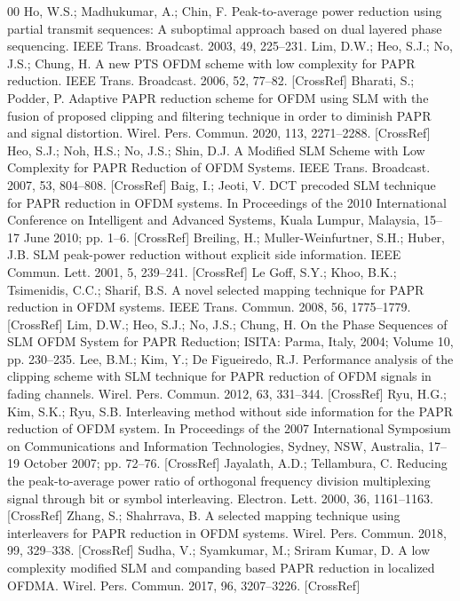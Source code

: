 \documentclass[conference]{IEEEtran}
\begin{document}
\begin{thebibliography}{00}
 Ho, W.S.; Madhukumar, A.; Chin, F. Peak-to-average power reduction using partial transmit sequences: A suboptimal approach based on dual layered phase sequencing. IEEE Trans. Broadcast. 2003, 49, 225–231.
 Lim, D.W.; Heo, S.J.; No, J.S.; Chung, H. A new PTS OFDM scheme with low complexity for PAPR reduction. IEEE Trans. Broadcast. 2006, 52, 77–82. [CrossRef]
 Bharati, S.; Podder, P. Adaptive PAPR reduction scheme for OFDM using SLM with the fusion of proposed clipping and filtering technique in order to diminish PAPR and signal distortion. Wirel. Pers. Commun. 2020, 113, 2271–2288. [CrossRef]
 Heo, S.J.; Noh, H.S.; No, J.S.; Shin, D.J. A Modified SLM Scheme with Low Complexity for PAPR Reduction of OFDM Systems. IEEE Trans. Broadcast. 2007, 53, 804–808. [CrossRef]
 Baig, I.; Jeoti, V. DCT precoded SLM technique for PAPR reduction in OFDM systems. In Proceedings of the 2010 International Conference on Intelligent and Advanced Systems, Kuala Lumpur, Malaysia, 15–17 June 2010; pp. 1–6. [CrossRef]
 Breiling, H.; Muller-Weinfurtner, S.H.; Huber, J.B. SLM peak-power reduction without explicit side information. IEEE Commun. Lett. 2001, 5, 239–241. [CrossRef]
 Le Goff, S.Y.; Khoo, B.K.; Tsimenidis, C.C.; Sharif, B.S. A novel selected mapping technique for PAPR reduction in OFDM systems. IEEE Trans. Commun. 2008, 56, 1775–1779. [CrossRef]
 Lim, D.W.; Heo, S.J.; No, J.S.; Chung, H. On the Phase Sequences of SLM OFDM System for PAPR Reduction; ISITA: Parma, Italy, 2004; Volume 10, pp. 230–235.
 Lee, B.M.; Kim, Y.; De Figueiredo, R.J. Performance analysis of the clipping scheme with SLM technique for PAPR reduction of OFDM signals in fading channels. Wirel. Pers. Commun. 2012, 63, 331–344. [CrossRef]
 Ryu, H.G.; Kim, S.K.; Ryu, S.B. Interleaving method without side information for the PAPR reduction of OFDM system. In Proceedings of the 2007 International Symposium on Communications and Information Technologies, Sydney, NSW, Australia, 17–19 October 2007; pp. 72–76. [CrossRef]
 Jayalath, A.D.; Tellambura, C. Reducing the peak-to-average power ratio of orthogonal frequency division multiplexing signal through bit or symbol interleaving. Electron. Lett. 2000, 36, 1161–1163. [CrossRef]
 Zhang, S.; Shahrrava, B. A selected mapping technique using interleavers for PAPR reduction in OFDM systems. Wirel. Pers. Commun. 2018, 99, 329–338. [CrossRef]
 Sudha, V.; Syamkumar, M.; Sriram Kumar, D. A low complexity modified SLM and companding based PAPR reduction in localized OFDMA. Wirel. Pers. Commun. 2017, 96, 3207–3226. [CrossRef]

\end{thebibliography}
\end{document}
